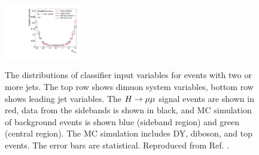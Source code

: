 \begin{figure}[h!]
  \includegraphics[width=0.3\textwidth]{figures/hmumu/vars/DeltaPhi_mumuj1} \\ 
  \caption[Classifier input variables]{
  The distributions of classifier
  input variables for events with two or more jets. The top row shows dimuon
  system variables, bottom row shows leading jet variables. The $H \rightarrow \mu\mu$ signal events
  are shown in red, data from the sidebands is shown in black, and MC
  simulation of background events is shown blue (sideband region) and
  green (central region). The MC simulation includes DY, diboson, and top events.
  The error bars are statistical. Reproduced from Ref. \cite{ATLAS-CONF-2019-028}.
  }
  \label{fig:hmumu:variables01}
\end{figure}

